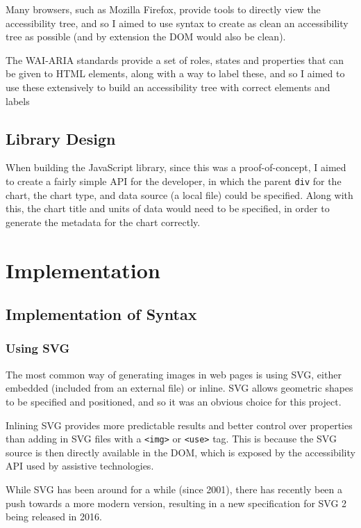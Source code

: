 \documentclass[ %
                    author={Aleena Baig},
                supervisor={Dr Simon Lock},
                    degree={BSc},
                     title={On Making Web Accessible Graphs},
                  subtitle={},
                      year={2019} ]{dissertation}
\begin{document}
Many browsers, such as Mozilla Firefox, provide tools to directly view the accessibility tree, and so I aimed to use syntax to create as clean an accessibility tree as possible (and by extension the DOM would also be clean).

The WAI-ARIA standards provide a set of roles, states and properties that can be given to HTML elements, along with a way to label these, and so I aimed to use these extensively to build an accessibility tree with correct elements and labels

\section{Library Design}

When building the JavaScript library, since this was a proof-of-concept, I aimed to create a fairly simple API for the developer, in which the parent \texttt{div} for the chart, the chart type, and data source (a local file) could be specified. Along with this, the chart title and units of data would need to be specified, in order to generate the metadata for the chart correctly.

\chapter{Implementation}

\section{Implementation of Syntax}

\subsection{Using SVG}

The most common way of generating images in web pages is using SVG, either embedded (included from an external file) or inline. SVG allows geometric shapes to be specified and positioned, and so it was an obvious choice for this project.

Inlining SVG provides more predictable results and better control over properties than adding in SVG files with a \texttt{<img>} or \texttt{<use>} tag. This is because the SVG source is then directly available in the DOM, which is exposed by the accessibility API used by assistive technologies.

While SVG has been around for a while (since 2001), there has recently been a push towards a more modern version, resulting in a new specification for SVG 2 being released in 2016.
\end{document}
